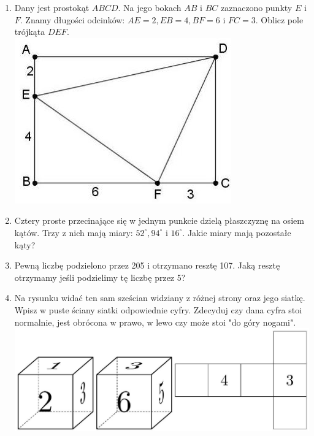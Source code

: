 \documentclass[10pt]{article}
\begin{document}
\begin{enumerate}
  \item Dany jest prostokąt \(A B C D\). Na jego bokach \(A B\) i \(B C\) zaznaczono punkty \(E\) i \(F\). Znamy długości odcinków: \(A E=2, E B=4, B F=6\) i \(F C=3\). Oblicz pole trójkąta \(D E F\).\\
\includegraphics[max width=\textwidth, center]{2024_11_21_a8036543db8f2963a2e7g-1(1)}
  \item Cztery proste przecinające się w jednym punkcie dzielą płaszczyznę na osiem kątów. Trzy z nich mają miary: \(52^{\circ}, 94^{\circ}\) i \(16^{\circ}\). Jakie miary mają pozostałe kąty?
  \item Pewną liczbę podzielono przez 205 i otrzymano resztę 107. Jaką resztę otrzymamy jeśli podzielimy tę liczbę przez 5?
  \item Na rysunku widać ten sam sześcian widziany z różnej strony oraz jego siatkę. Wpisz w puste ściany siatki odpowiednie cyfry. Zdecyduj czy dana cyfra stoi normalnie, jest obrócona w prawo, w lewo czy może stoi "do góry nogami".\\
\includegraphics[max width=\textwidth, center]{2024_11_21_a8036543db8f2963a2e7g-1(2)}

\end{enumerate}
\end{document}

